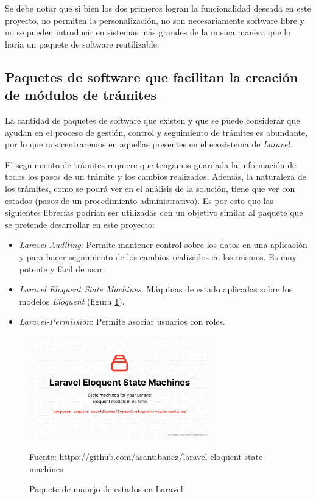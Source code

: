 Se debe notar que si bien los dos primeros logran la funcionalidad deseada en este proyecto, no permiten la personalización, no son necesariamente software libre y no se pueden introducir en sistemas más grandes de la misma manera que lo haría un paquete de software reutilizable.

\subsection{Paquetes de software que facilitan la creación de módulos de trámites}

La cantidad de paquetes de software que existen y que se puede considerar que ayudan en el proceso de gestión, control y seguimiento de trámites es abundante, por lo que nos centraremos en aquellas presentes en el ecosistema de \textit{Laravel}.

El seguimiento de trámites requiere que tengamos guardada la información de todos los pasos de un trámite y los cambios realizados. Además, la naturaleza de los trámites, como se podrá ver en el análisis de la solución, tiene que ver con estados (pasos de un procedimiento administrativo). Es por esto que las siguientes librerías podrían ser utilizadas con un objetivo similar al paquete que se pretende desarrollar en este proyecto:

\begin{itemize}
    \item \textit{Laravel Auditing}: Permite mantener control sobre los datos en una aplicación y para hacer seguimiento de los cambios realizados en los mismos. Es muy potente y fácil de usar.
    \item \textit{Laravel Eloquent State Machines}: Máquinas de estado aplicadas sobre los modelos \textit{Eloquent} (figura \ref{fig:laravelstatemachines}).
    \item \textit{Laravel-Permission}: Permite asociar usuarios con roles.
\end{itemize}

\begin{figure}[!h]
    \centering
    \includegraphics[width=0.7\textwidth]{assets/laravelstatemachines}
    \caption{Paquete de manejo de estados en Laravel}{Fuente: https://github.com/asantibanez/laravel-eloquent-state-machines}
    \label{fig:laravelstatemachines}
\end{figure}

